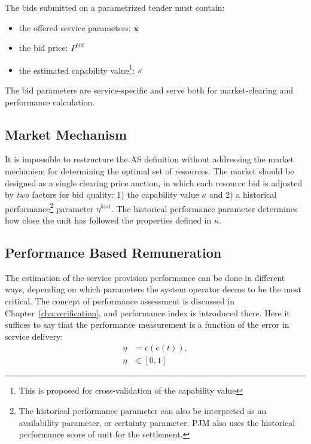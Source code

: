 The bids submitted on a parametrized tender must contain: 
\begin{itemize}
\item the offered service parameters: $\mathbf{x}$
\item the bid price: $P^{bid}$
\item the estimated capability value\footnote{This is proposed for cross-validation of the capability value}: $\kappa$
\end{itemize}

The bid parameters are service-specific and serve both for market-clearing and performance calculation. 

\subsection*{Market Mechanism} %
\label{sub:MarketMechanism}
It is impossible to restructure the AS definition without addressing the market mechanism for determining the optimal set of resources. The market should be designed as a single clearing price auction, in which each resource bid is adjusted by \emph{two} factors for bid quality: 1) the capability value $\kappa$ and 2) a historical performance\footnote{The historical performance parameter can also be interpreted as an availability parameter, or certainty parameter. PJM also uses the historical performance score of unit for the settlement.} parameter $\eta^{hist}$. The historical performance parameter determines how close the unit has followed the properties defined in $\kappa$. 

\subsection*{Performance Based Remuneration} %
\label{sub:PerformanceBasedRemuneration}
The estimation of the service provision performance can be done in different ways, depending on which parameters the system operator deems to be the most critical. The concept of performance assessment is discussed in Chapter~\ref{cha:verification}, and performance index is introduced there. Here it suffices to say that the performance measurement is a function of the error in service delivery:
\begin{align}
	\eta &= c(e(t)), \label{eq:perfindexsimple}\\
	\eta &\in [0,1]
\end{align}

